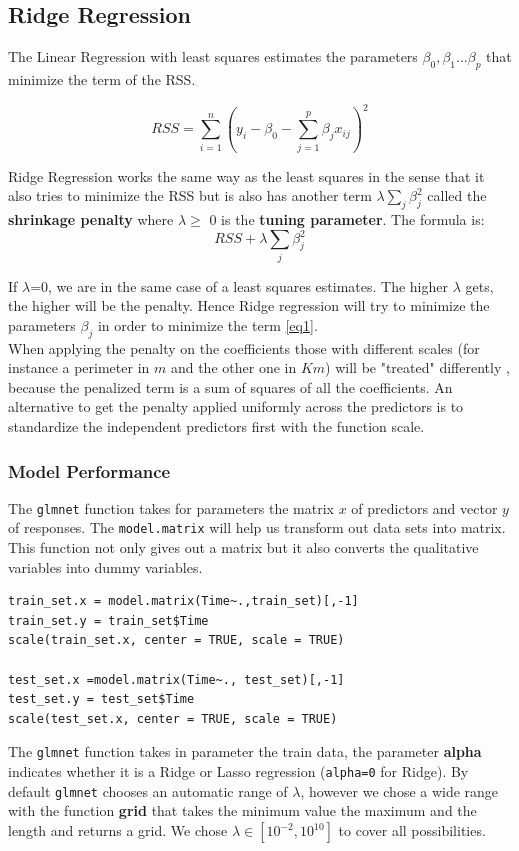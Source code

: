 \documentclass[]{report}
\begin{document}
\subsection{Ridge Regression}
The Linear Regression with least squares estimates the parameters $\beta_{0},\beta_{1}...\beta_{p}$ that minimize the term of the RSS.
\begin{center}
	$$ RSS = \sum_{i=1}^{n}(y_{i} - \beta_{0} - \sum_{j=1}^{p}\beta_{j}x_{ij})^{2} $$
\end{center}

Ridge Regression works the same way as the least squares in the sense that it also tries to minimize the RSS but is also has another term $\lambda \sum_{j}\beta_{j}^{2}$ called the \textbf{shrinkage penalty} where $\lambda\geq$ 0 is the \textbf{ tuning parameter}. The formula is:
\begin{equation} \label{eq1}
RSS + \lambda \sum_{j}\beta_{j}^{2}
\end{equation}			

If $\lambda$=0, we are in the same case of a least squares estimates. The higher $\lambda$ gets, the higher will be the penalty. Hence Ridge regression will try to minimize the parameters $\beta_{j}$ in order to minimize the term \ref{eq1}.\\
When applying the penalty on the coefficients those with different scales (for instance a perimeter in $m$ and the other one in $Km$) will be "treated" differently , because the penalized term is a sum of squares of all the coefficients. An alternative to get the penalty applied uniformly across the predictors is to standardize the independent predictors first with the function scale.

\subsubsection{Model Performance}
The \texttt{glmnet} function takes for parameters the matrix $x$ of predictors and vector $y$ of responses. The \texttt{model.matrix} will help us transform out data sets into matrix. This function not only gives out a matrix but it also converts the qualitative variables into dummy variables.
\begin{lstlisting}
train_set.x = model.matrix(Time~.,train_set)[,-1] 
train_set.y = train_set$Time
scale(train_set.x, center = TRUE, scale = TRUE)

test_set.x =model.matrix(Time~., test_set)[,-1]
test_set.y = test_set$Time
scale(test_set.x, center = TRUE, scale = TRUE)
\end{lstlisting}
The \texttt{glmnet} function takes in parameter the train data, the parameter \textbf{alpha} indicates whether it is a Ridge or Lasso regression (\texttt{alpha=0} for Ridge). By default \texttt{glmnet} chooses an automatic range of $\lambda$, however we chose a wide range with the function \textbf{grid} that takes the minimum value the maximum and the length and returns a grid. We chose $\lambda\in[10^{−2},10^{10}]$ to cover all possibilities.
\end{document}
